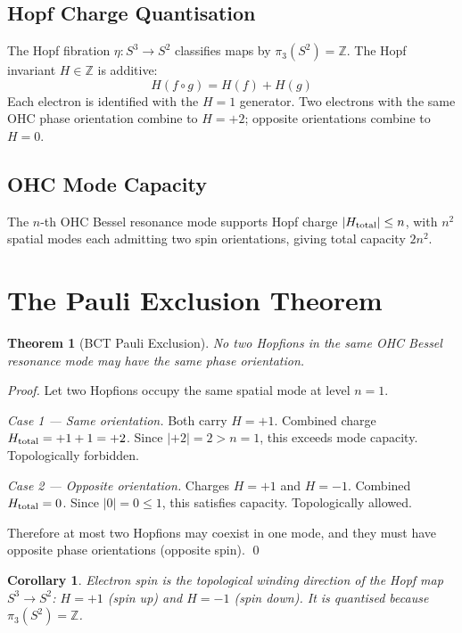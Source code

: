 \documentclass[aps,prl,twocolumn,showpacs,superscriptaddress]{revtex4-2}
\newtheorem{theorem}{Theorem}
\newtheorem{corollary}{Corollary}
\begin{document}
\subsection{Hopf Charge Quantisation}

The Hopf fibration $\eta: S^3\to S^2$ classifies maps by 
$\pi_3(S^2)=\mathbb{Z}$. The Hopf invariant $H\in\mathbb{Z}$ is additive:
\begin{equation}
    H(f \circ g) = H(f) + H(g)
\end{equation}
Each electron is identified with the $H=1$ generator. Two electrons 
with the same OHC phase orientation combine to $H=+2$; opposite 
orientations combine to $H=0$.

\subsection{OHC Mode Capacity}

The $n$-th OHC Bessel resonance mode supports Hopf charge 
$|H_{\rm total}|\leq n$, with $n^2$ spatial modes each 
admitting two spin orientations, giving total capacity $2n^2$.

\section{The Pauli Exclusion Theorem}

\begin{theorem}[BCT Pauli Exclusion]
No two Hopfions in the same OHC Bessel resonance mode may have 
the same phase orientation.
\end{theorem}

\begin{proof}
Let two Hopfions occupy the same spatial mode at level $n=1$.

\textit{Case 1 --- Same orientation.} Both carry $H=+1$. Combined 
charge $H_{\rm total} = +1+1 = +2$. Since $|{+2}|=2>n=1$, this 
exceeds mode capacity. Topologically forbidden.

\textit{Case 2 --- Opposite orientation.} Charges $H=+1$ and $H=-1$. 
Combined $H_{\rm total} = 0$. Since $|0|=0\leq1$, this satisfies 
capacity. Topologically allowed.

Therefore at most two Hopfions may coexist in one mode, and they 
must have opposite phase orientations (opposite spin). \qed
\end{proof}

\begin{corollary}
Electron spin is the topological winding direction of the Hopf 
map $S^3\to S^2$: $H=+1$ (spin up) and $H=-1$ (spin down). 
It is quantised because $\pi_3(S^2)=\mathbb{Z}$.
\end{corollary}
\end{document}
